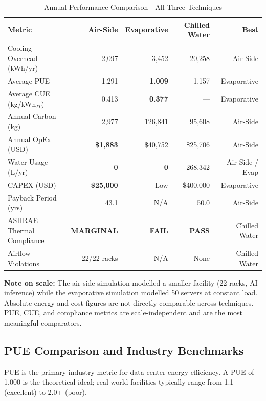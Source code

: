 ﻿\documentclass[12pt,a4paper]{report}
\newcommand{\pass}{\textcolor{passgreen}{\textbf{PASS}}}
\newcommand{\fail}{\textcolor{failred}{\textbf{FAIL}}}
\newcommand{\marginal}{\textcolor{warnorng}{\textbf{MARGINAL}}}
\begin{document}
\begin{table}[H]
\centering
\caption{Annual Performance Comparison - All Three Techniques}
\label{tab:master_compare}
\renewcommand{\arraystretch}{1.45}
\begin{tabular}{lrrrr}
\toprule
\textbf{Metric} & \textbf{Air-Side} & \textbf{Evaporative} & \textbf{Chilled Water} & \textbf{Best} \\
\midrule
Cooling Overhead (kWh/yr) & 2{,}097 & 3{,}452 & 20{,}258 & Air-Side \\
Average PUE & 1.291 & \textbf{1.009} & 1.157 & Evaporative \\
Average CUE (kg/kWh$_{IT}$) & 0.413 & \textbf{0.377} & --- & Evaporative \\
Annual Carbon (kg) & 2{,}977 & 126{,}841 & 95{,}608 & Air-Side \\
Annual OpEx (USD) & \textbf{\$1{,}883} & \$40{,}752 & \$25{,}706 & Air-Side \\
Water Usage (L/yr) & \textbf{0} & \textbf{0} & 268{,}342 & Air-Side / Evap \\
CAPEX (USD) & \textbf{\$25{,}000} & Low & \$400{,}000 & Evaporative \\
Payback Period (yrs) & 43.1 & N/A & 50.0 & Air-Side \\
ASHRAE Thermal Compliance & \marginal & \fail & \textbf{\pass} & Chilled Water \\
Airflow Violations & 22/22 racks & N/A & None & Chilled Water \\
\bottomrule
\end{tabular}
\end{table}

\noindent\textbf{Note on scale:} The air-side simulation modelled a smaller facility (22 racks,
AI inference) while the evaporative simulation modelled 50 servers at constant load.
Absolute energy and cost figures are not directly comparable across techniques. PUE, CUE,
and compliance metrics are scale-independent and are the most meaningful comparators.

\subsection{PUE Comparison and Industry Benchmarks}

PUE is the primary industry metric for data center energy efficiency. A PUE of 1.000 is
the theoretical ideal; real-world facilities typically range from 1.1 (excellent) to
2.0+ (poor).
\end{document}
